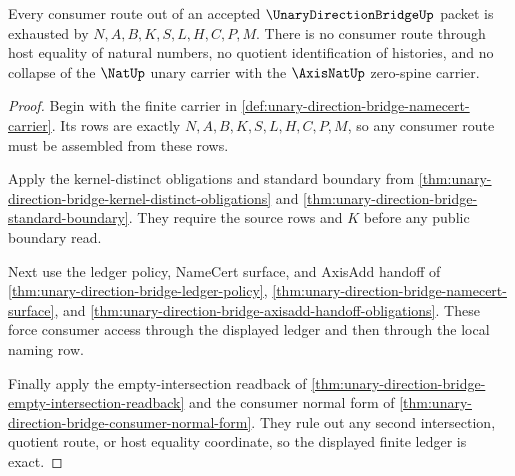 \begin{theorem}
\label{thm:unary-direction-bridge-ledger-exactness}
Every consumer route out of an accepted $\UnaryDirectionBridgeUp$ packet is exhausted by $N,A,B,K,S,L,H,C,P,M$. There is no consumer route through host equality of natural numbers, no quotient identification of histories, and no collapse of the $\NatUp$ unary carrier with the $\AxisNatUp$ zero-spine carrier.
\end{theorem}
\begin{proof}
Begin with the finite carrier in \autoref{def:unary-direction-bridge-namecert-carrier}. Its rows are exactly $N,A,B,K,S,L,H,C,P,M$, so any consumer route must be assembled from these rows.

Apply the kernel-distinct obligations and standard boundary from \autoref{thm:unary-direction-bridge-kernel-distinct-obligations} and \autoref{thm:unary-direction-bridge-standard-boundary}. They require the source rows and $K$ before any public boundary read.

Next use the ledger policy, NameCert surface, and AxisAdd handoff of \autoref{thm:unary-direction-bridge-ledger-policy}, \autoref{thm:unary-direction-bridge-namecert-surface}, and \autoref{thm:unary-direction-bridge-axisadd-handoff-obligations}. These force consumer access through the displayed ledger and then through the local naming row.

Finally apply the empty-intersection readback of \autoref{thm:unary-direction-bridge-empty-intersection-readback} and the consumer normal form of \autoref{thm:unary-direction-bridge-consumer-normal-form}. They rule out any second intersection, quotient route, or host equality coordinate, so the displayed finite ledger is exact.
\end{proof}

